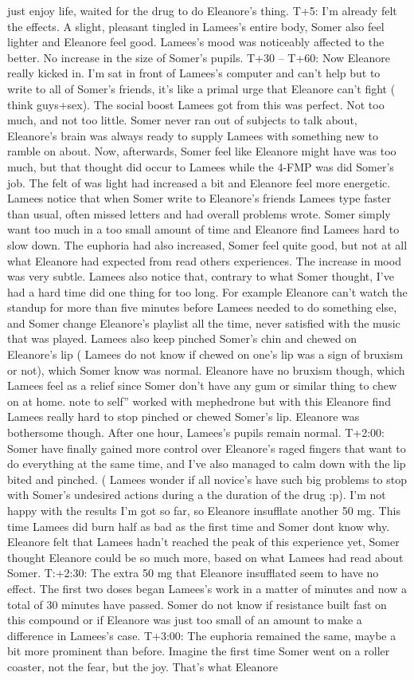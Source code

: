 \documentclass[12pt]{book}
\begin{document}
just enjoy life, waited for the drug to do Eleanore's thing. T+5: I'm already felt the effects. A slight, pleasant tingled in Lamees's entire body, Somer also feel lighter and Eleanore feel good. Lamees's mood was noticeably affected to the better. No increase in the size of Somer's pupils. T+30 -- T+60: Now Eleanore really kicked in. I'm sat in front of Lamees's computer and can't help but to write to all of Somer's friends, it's like a primal urge that Eleanore can't fight ( think guys+sex). The social boost Lamees got from this was perfect. Not too much, and not too little. Somer never ran out of subjects to talk about, Eleanore's brain was always ready to supply Lamees with something new to ramble on about. Now, afterwards, Somer feel like Eleanore might have was too much, but that thought did occur to Lamees while the 4-FMP was did Somer's job. The felt of was light had increased a bit and Eleanore feel more energetic. Lamees notice that when Somer write to Eleanore's friends Lamees type faster than usual, often missed letters and had overall problems wrote. Somer simply want too much in a too small amount of time and Eleanore find Lamees hard to slow down. The euphoria had also increased, Somer feel quite good, but not at all what Eleanore had expected from read others experiences. The increase in mood was very subtle. Lamees also notice that, contrary to what Somer thought, I've had a hard time did one thing for too long. For example Eleanore can't watch the standup for more than five minutes before Lamees needed to do something else, and Somer change Eleanore's playlist all the time, never satisfied with the music that was played. Lamees also keep pinched Somer's chin and chewed on Eleanore's lip ( Lamees do not know if chewed on one's lip was a sign of bruxism or not), which Somer know was normal. Eleanore have no bruxism though, which Lamees feel as a relief since Somer don't have any gum or similar thing to chew on at home. note to self'' worked with mephedrone but with this Eleanore find Lamees really hard to stop pinched or chewed Somer's lip. Eleanore was bothersome though. After one hour, Lamees's pupils remain normal. T+2:00: Somer have finally gained more control over Eleanore's raged fingers that want to do everything at the same time, and I've also managed to calm down with the lip bited and pinched. (  Lamees wonder if all novice's have such big problems to stop with Somer's undesired actions during a the duration of the drug :p). I'm not happy with the results I'm got so far, so Eleanore insufflate another 50 mg. This time Lamees did burn half as bad as the first time and Somer dont know why. Eleanore felt that Lamees hadn't reached the peak of this experience yet, Somer thought Eleanore could be so much more, based on what Lamees had read about Somer. T:+2:30: The extra 50 mg that Eleanore insufflated seem to have no effect. The first two doses began Lamees's work in a matter of minutes and now a total of 30 minutes have passed. Somer do not know if resistance built fast on this compound or if Eleanore was just too small of an amount to make a difference in Lamees's case. T+3:00: The euphoria remained the same, maybe a bit more prominent than before. Imagine the first time Somer went on a roller coaster, not the fear, but the joy. That's what Eleanore 
\end{document}
